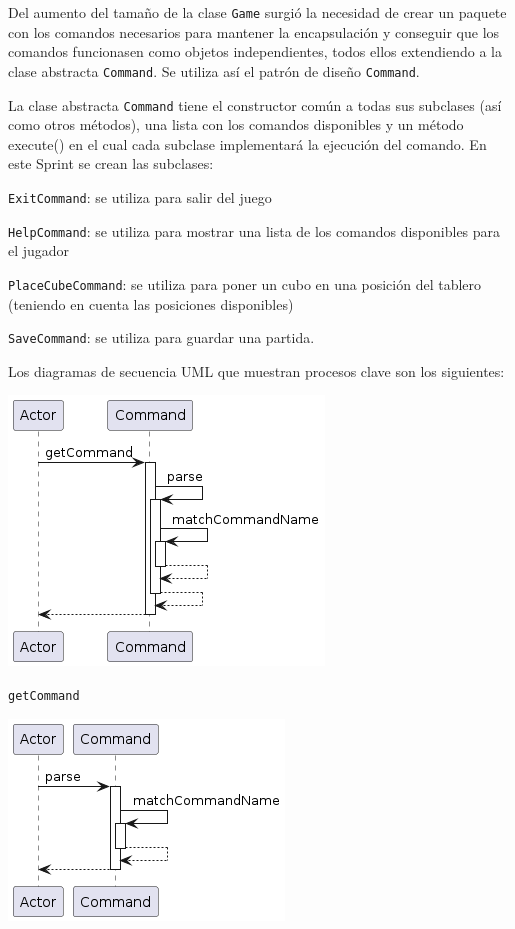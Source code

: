 \documentclass[../DocumentoOficial.tex]{subfiles}
\begin{document}
\begin{sprint}[2]
Del aumento del tamaño de la clase \texttt{Game} surgió la necesidad de crear un paquete con los comandos necesarios para mantener la encapsulación y conseguir que los comandos funcionasen como objetos independientes, todos ellos extendiendo a la clase abstracta \texttt{Command}. Se utiliza así el patrón de diseño \texttt{Command}.

La clase abstracta \texttt{Command} tiene el constructor común a todas sus subclases (así como otros métodos), una lista con los comandos disponibles y un método execute() en el cual cada subclase implementará la ejecución del comando. En este Sprint se crean las subclases:

\item \texttt{ExitCommand}: se utiliza para salir del juego

\item \texttt{HelpCommand}: se utiliza para mostrar una lista de los comandos disponibles para el jugador

\item \texttt{PlaceCubeCommand}: se utiliza para poner un cubo en una posición del tablero (teniendo en cuenta las posiciones disponibles)

\item \texttt{SaveCommand}: se utiliza para guardar una partida.

Los diagramas de secuencia UML que muestran procesos clave son los siguientes:

\begin{center}
\includegraphics[scale=0.5]{Command_getCommand.png}

\texttt{getCommand}
\end{center}
\begin{center}
\includegraphics[scale=0.5]{Command_parse.png}


\end{center}
\end{sprint}
\end{document}
